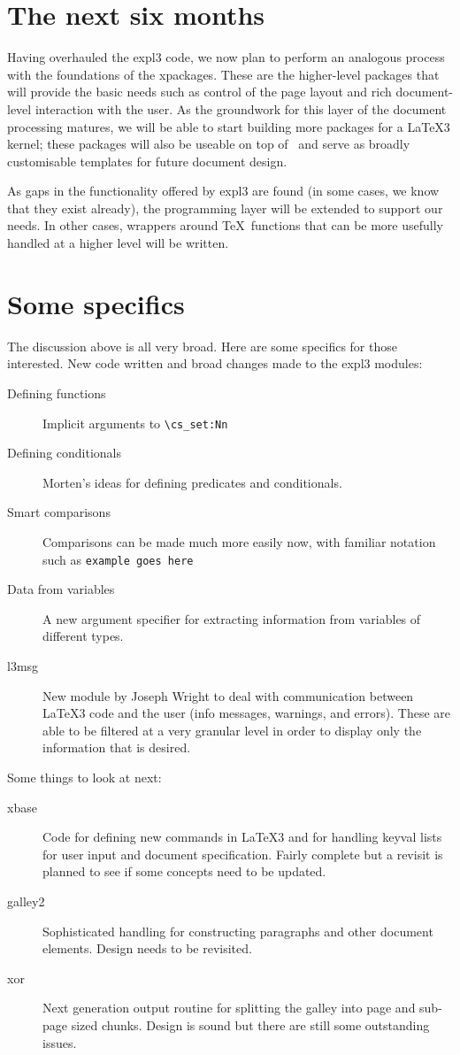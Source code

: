 \documentclass{ltnews}
\begin{document}
\section{The next six months}

Having overhauled the \textsf{expl3} code, we now plan to perform an analogous process with the foundations of the \textsf{xpackages}. These are the higher-level packages that will provide the basic needs such as control of the page layout and rich document-level interaction with the user. As the groundwork for this layer of the document processing matures, we will be able to start building more packages for a \LaTeX3 kernel; these packages will also be useable on top of \LaTeXe\ and serve as broadly customisable templates for future document design.

As gaps in the functionality offered by \textsf{expl3} are found (in some cases, we know that they exist already), the programming layer will be extended to support our needs. In other cases, wrappers around \TeX\ functions that can be more usefully handled at a higher level will be written.

\section{Some specifics}

The discussion above is all very broad. Here are some specifics for those interested. New code written and broad changes made to the \textsf{expl3} modules:
\begin{description}
\item [Defining functions] Implicit arguments to \verb|\cs_set:Nn|
\item [Defining conditionals] Morten's ideas for defining predicates and conditionals.
\item [Smart comparisons] Comparisons can be made much more easily now, with familiar notation such as \verb|example goes here|
\item [Data from variables] A new argument specifier for extracting information from variables of different types.
\item [l3msg] New module by Joseph Wright to deal with communication between \LaTeX3 code and the user (info messages, warnings, and errors). These are able to be filtered at a very granular level in order to display only the information that is desired.
\end{description}

Some things to look at next:
\begin{description}
\item [xbase] Code for defining new commands in \LaTeX3 and for handling keyval lists for user input and document specification. Fairly complete but a revisit is planned to see if some concepts need to be updated.
\item [galley2] Sophisticated handling for constructing paragraphs and other document elements. Design needs to be revisited.
\item [xor] Next generation output routine for splitting the galley into page and sub-page sized chunks. Design is sound but there are still some outstanding issues.
\end{description}
\end{document}

